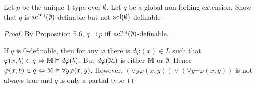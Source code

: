 \documentclass[11pt]{article}
\begin{document}
\begin{exercise}
Let \(p\) be the unique 1-type over \(\emptyset\). Let \(q\) be a global non-forking extension. Show
that \(q\) is \(\operatorname{acl}^{\operatorname{eq}}(\emptyset)\)-definable but not \(\operatorname{acl}(\emptyset)\)-definable
\end{exercise}

\begin{proof}
By Proposition 5.6, \(q\sqsupseteq p\) iff \(\operatorname{acl}^{\operatorname{eq}}(\emptyset)\)-definable.

If \(q\) is 0-definable, then for any \(\varphi\) there is \(d\varphi(x)\in L\) such that \(\varphi(x,b)\in q\Leftrightarrow\mathbb{M}\vDash d\varphi(b)\).
But \(d\varphi(\mathbb{M})\) is either \(\mathbb{M}\) or \(\emptyset\). Hence \(\varphi(x,b)\in q\Leftrightarrow\mathbb{M}\vDash\forall y\varphi(x,y)\).
However, \((\forall y\varphi(x,y))\vee(\forall y\neg\varphi(x,y))\) is not always true and \(q\) is only a partial type
\end{proof}
\end{document}
